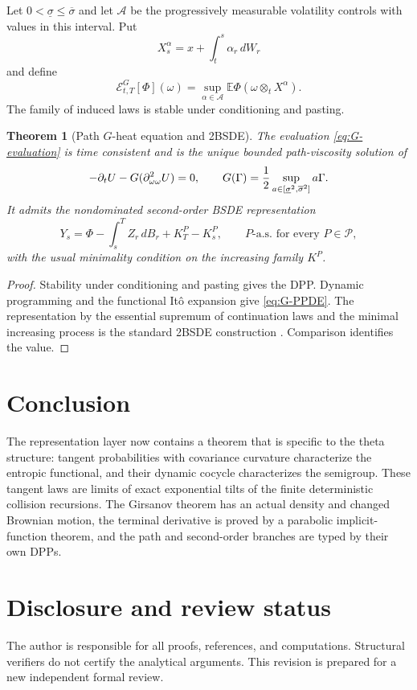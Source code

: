\documentclass[11pt,reqno]{amsart}
\newtheorem{theorem}{Theorem}[section]
\theoremstyle{definition}
\theoremstyle{remark}
\newcommand{\E}{\mathbb E}
\begin{document}
Let $0<\underline\sigma\le\overline\sigma$ and let
$\mathcal A$ be the progressively measurable volatility controls with values
in this interval.  Put
\[
 X_s^{\alpha}=x+\int_t^s\alpha_r\,dW_r
\]
and define
\begin{equation}\label{eq:G-evaluation}
 \mathcal E_{t,T}^G[\Phi](\omega)
 =\sup_{\alpha\in\mathcal A}
 \E\Phi\left(\omega\otimes_tX^\alpha\right).
\end{equation}
The family of induced laws is stable under conditioning and pasting.

\begin{theorem}[Path $G$-heat equation and 2BSDE]\label{thm:2BSDE}
The evaluation \eqref{eq:G-evaluation} is time consistent and is the unique
bounded path-viscosity solution of
\begin{equation}\label{eq:G-PPDE}
 -\partial_tU-G(\partial_{\omega\omega}^2U)=0,
 \qquad
 G(\Gamma)={1\over2}
 \sup_{a\in[\underline\sigma^2,\overline\sigma^2]}a\Gamma.
\end{equation}
It admits the nondominated second-order BSDE representation
\begin{equation}\label{eq:2BSDE}
 Y_s=\Phi-\int_s^TZ_r\,dB_r+K_T^P-K_s^P,
 \qquad P\text{-a.s. for every }P\in\mathcal P,
\end{equation}
with the usual minimality condition on the increasing family $K^P$.
\end{theorem}

\begin{proof}
Stability under conditioning and pasting gives the DPP.  Dynamic programming
and the functional It\^o expansion give \eqref{eq:G-PPDE}.  The representation
by the essential supremum of continuation laws and the minimal increasing
process is the standard 2BSDE construction
\cite{CheriditoSonerTouziVictoir2007,SonerTouziZhang2012}.  Comparison
identifies the value.
\end{proof}

\section{Conclusion}

The representation layer now contains a theorem that is specific to the theta
structure: tangent probabilities with covariance curvature characterize the
entropic functional, and their dynamic cocycle characterizes the semigroup.
These tangent laws are limits of exact exponential tilts of the finite
deterministic collision recursions.  The Girsanov theorem has an actual density
and changed Brownian motion, the terminal derivative is proved by a parabolic
implicit-function theorem, and the path and second-order branches are typed by
their own DPPs.

\section*{Disclosure and review status}
The author is responsible for all proofs, references, and computations.
Structural verifiers do not certify the analytical arguments.  This revision
is prepared for a new independent formal review.



\end{document}
